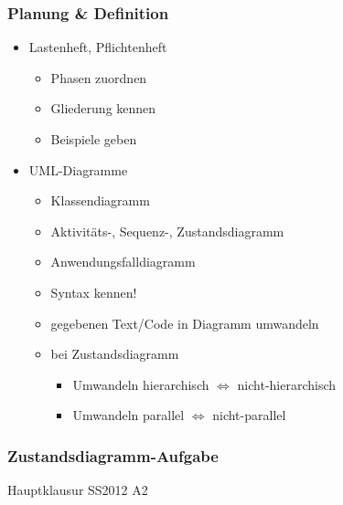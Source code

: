 \documentclass[18pt]{beamer}
\begin{document}
	\begin{frame}
		\frametitle{Planung \& Definition}
		\begin{itemize}
			\item Lastenheft, Pflichtenheft \pause
			\begin{itemize}
				\item Phasen zuordnen \pause
				\item Gliederung kennen \pause
				\item Beispiele geben \pause
			\end{itemize}
			\item UML-Diagramme \pause
			\begin{itemize}
				\item Klassendiagramm \pause
				\item Aktivitäts-, Sequenz-, Zustandsdiagramm \pause 
				\item Anwendungsfalldiagramm \pause
				\item Syntax kennen! \pause
				\item gegebenen Text/Code in Diagramm umwandeln \pause
				\item bei Zustandsdiagramm
				\begin{itemize}
					\item Umwandeln hierarchisch $\Leftrightarrow$ nicht-hierarchisch 
					\item Umwandeln parallel $\Leftrightarrow$ nicht-parallel
				\end{itemize}
			\end{itemize}
		\end{itemize}
	\end{frame}

	\begin{frame}
		\frametitle{Zustandsdiagramm-Aufgabe}
		\begin{huge}
			 	\centering Hauptklausur SS2012 A2
		\end{huge}
	\end{frame}
\end{document}
